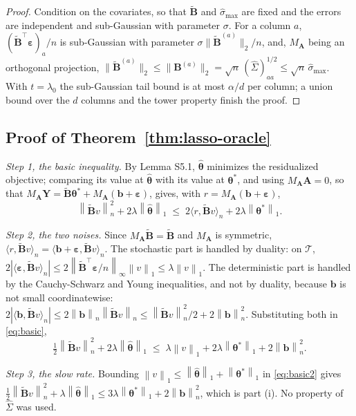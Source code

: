 \documentclass[10pt]{book}
\theoremstyle{definition}
\newcommand{\T}{^{\top}}
\newcommand{\norm}[1]{\left\lVert #1 \right\rVert}
\newcommand{\normn}[1]{\left\lVert #1 \right\rVert_{n}}
\newcommand{\inner}[2]{\langle #1, #2 \rangle}
\newcommand{\btheta}{\boldsymbol{\theta}}
\newcommand{\thetastar}{\btheta^{*}}
\newcommand{\thetahat}{\widehat{\btheta}}
\newcommand{\Gramhat}{\widehat{\Sigma}}
\newcommand{\pen}{\lambda}
\newcommand{\Amat}{\mathbf{A}}
\newcommand{\Bmat}{\mathbf{B}}
\newcommand{\Btil}{\widetilde{\Bmat}}
\newcommand{\MA}{M_{\Amat}}
\newcommand{\bveps}{\boldsymbol{\varepsilon}}
\newcommand{\bb}{\mathbf{b}}
\newcommand{\bY}{\mathbf{Y}}
\newcommand{\smax}{\widehat{\sigma}_{\max}}
\begin{document}
{\begin{proof}
Condition on the covariates, so that $\Btil$ and $\smax$ are fixed and the
errors are independent and sub-Gaussian with parameter $\sigma$. For a column
$a$, $(\Btil\T\bveps)_a/n$ is sub-Gaussian with parameter
$\sigma\lVert\Btil^{(a)}\rVert_2/n$, and, $\MA$ being an orthogonal
projection, $\lVert\Btil^{(a)}\rVert_2 \le \lVert\Bmat^{(a)}\rVert_2 =
\sqrt{n}\,(\Gramhat)_{aa}^{1/2} \le \sqrt{n}\,\smax$. With
$t = \pen_0$ the sub-Gaussian tail bound is at most $\alpha/d$ per column; a
union bound over the $d$ columns and the tower property finish the proof.
\end{proof}

\subsection*{Proof of Theorem~\ref{thm:lasso-oracle}}

\emph{Step 1, the basic inequality.} By Lemma S5.1, $\thetahat$ minimizes the
residualized objective; comparing its value at $\thetahat$ with its value at
$\thetastar$, and using $\MA\Amat = 0$, so that
$\MA\bY = \Btil\thetastar + \MA(\bb+\bveps)$, gives, with
$r = \MA(\bb+\bveps)$,
\begin{equation}
  \label{eq:basic}
  \normn{\Btil v}^2 + 2\pen\norm{\thetahat}_1
  \;\le\; 2\inner{r}{\Btil v}_n + 2\pen\norm{\thetastar}_1 .
\end{equation}

\emph{Step 2, the two noises.} Since $\MA\Btil = \Btil$ and $\MA$ is
symmetric, $\inner{r}{\Btil v}_n = \inner{\bb+\bveps}{\Btil v}_n$. The
stochastic part is handled by duality: on $\mathcal{T}$,
$2|\inner{\bveps}{\Btil v}_n| \le
2\norm{\Btil\T\bveps/n}_{\infty}\norm{v}_1 \le \pen\norm{v}_1$. The
deterministic part is handled by the Cauchy-Schwarz and Young inequalities,
and not by duality, because $\bb$ is not small coordinatewise:
$2|\inner{\bb}{\Btil v}_n| \le 2\normn{\bb}\normn{\Btil v} \le
\normn{\Btil v}^2/2 + 2\normn{\bb}^2$. Substituting both in
\eqref{eq:basic},
\begin{equation}
  \label{eq:basic2}
  \tfrac12\normn{\Btil v}^2 + 2\pen\norm{\thetahat}_1
  \;\le\; \pen\norm{v}_1 + 2\pen\norm{\thetastar}_1 + 2\normn{\bb}^2 .
\end{equation}

\emph{Step 3, the slow rate.} Bounding
$\norm{v}_1 \le \norm{\thetahat}_1+\norm{\thetastar}_1$ in
\eqref{eq:basic2} gives
$\tfrac12\normn{\Btil v}^2 + \pen\norm{\thetahat}_1 \le
3\pen\norm{\thetastar}_1 + 2\normn{\bb}^2$, which is part (i). No property of
$\Gramhat$ was used.

}
\end{document}

